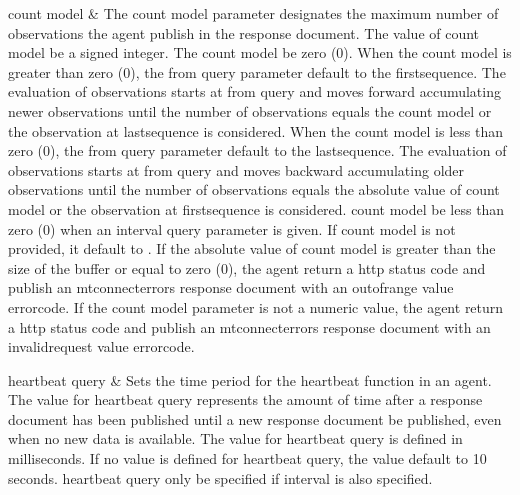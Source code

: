 \documentclass{mtconnect}	%
\providecommand{\DIFaddbegin}{} %
\begin{document}
\begin{longtabu}
\gls{count model}
&
The \gls{count model} parameter designates the maximum number of \glspl{observation} the \gls{agent} \MUST publish in the \gls{response document}.
\newline The value of \gls{count model} \MUST be a signed integer.
\newline The \gls{count model} \MUSTNOT be zero (0).
\newline When the \gls{count model} is greater than zero (0), the \gls{from query} parameter \MUST default to the \gls{firstsequence}. The evaluation of \glspl{observation} starts at \gls{from query} and moves forward accumulating newer \glspl{observation} until the number of \glspl{observation} equals the \gls{count model} or the  \gls{observation} at \gls{lastsequence} is considered.
\newline When the \gls{count model} is less than zero (0), the \gls{from query} parameter \MUST  default to the \gls{lastsequence}. The evaluation of \glspl{observation} starts at \gls{from query} and moves backward accumulating older \glspl{observation} until the number of \glspl{observation} equals the absolute value of \gls{count model} or the \gls{observation} at \gls{firstsequence} is considered.
\newline \gls{count model} \MUSTNOT be less than zero (0) when an \gls{interval query} parameter is given.
\newline If \gls{count model} is not provided, it \MUST default to .
\newline If the absolute value of \gls{count model} is greater than the size of the \gls{buffer} or equal to zero (0), the \gls{agent} \MUST return a  \gls{http status code} and \MUST publish an \gls{mtconnecterrors response document} with an \gls{outofrange value}  \gls{errorcode}.
\newline If the \gls{count model} parameter is not a numeric value, the \gls{agent} \MUST return a  \gls{http status code} and \MUST publish an \gls{mtconnecterrors response document} with an \gls{invalidrequest value}  \gls{errorcode}. \\
\hline

\gls{heartbeat query}
&
Sets the time period for the \gls{heartbeat} function in an \gls{agent}.
\newline The value for \gls{heartbeat query} represents the amount of time after a \gls{response document} has been published until a new \gls{response document} \MUST be published, even when no new data is available.  
\newline The value for \gls{heartbeat query} is defined in milliseconds.
\newline If no value is defined for \gls{heartbeat query}, the value \SHOULD default to 10 seconds.
\newline \gls{heartbeat query} \MUST only be specified if interval is also specified.
\DIFaddbegin \\ \hline


\end{longtabu}
\end{document}
